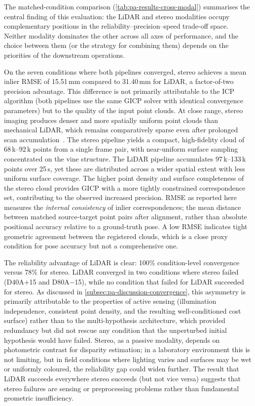 The matched-condition comparison (\cref{tab:pa-results-cross-modal}) summarises the central finding of this evaluation: the LiDAR and stereo modalities occupy complementary positions in the reliability--precision--speed trade-off space. Neither modality dominates the other across all axes of performance, and the choice between them (or the strategy for combining them) depends on the priorities of the downstream operations.

On the seven conditions where both pipelines converged, stereo achieves a mean inlier RMSE of 15.51\,mm compared to 31.40\,mm for LiDAR, a factor-of-two precision advantage. This difference is not primarily attributable to the ICP algorithm (both pipelines use the same GICP solver with identical convergence parameters) but to the quality of the input point clouds. At close range, stereo imaging produces denser and more spatially uniform point clouds than mechanical LiDAR, which remains comparatively sparse even after prolonged scan accumulation~\cite{stenEnhancingOffRoadTopography2025}. The stereo pipeline yields a compact, high-fidelity cloud of 68\,k--92\,k points from a single frame pair, with near-uniform surface sampling concentrated on the vine structure. The LiDAR pipeline accumulates 97\,k--133\,k points over 25\,s, yet these are distributed across a wider spatial extent with less uniform surface coverage. The higher point density and surface completeness of the stereo cloud provides GICP with a more tightly constrained correspondence set, contributing to the observed increased precision. RMSE as reported here measures the \emph{internal consistency} of inlier correspondences; the mean distance between matched source-target point pairs after alignment, rather than absolute positional accuracy relative to a ground-truth pose. A low RMSE indicates tight geometric agreement between the registered clouds, which is a close proxy condition for pose accuracy but not a comprehensive one.

The reliability advantage of LiDAR is clear: 100\% condition-level convergence versus 78\% for stereo. LiDAR converged in two conditions where stereo failed (D40A$+$15 and D80A$-$15), while no condition that failed for LiDAR succeeded for stereo. As discussed in \cref{subsec:pa-discussion-convergence}, this asymmetry is primarily attributable to the properties of active sensing (illumination independence, consistent point density, and the resulting well-conditioned cost surface) rather than to the multi-hypothesis architecture, which provided redundancy but did not rescue any condition that the unperturbed initial hypothesis would have failed. Stereo, as a passive modality, depends on photometric contrast for disparity estimation; in a laboratory environment this is not limiting, but in field conditions where lighting varies and surfaces may be wet or uniformly coloured, the reliability gap could widen further. The result that LiDAR succeeds everywhere stereo succeeds (but not vice versa) suggests that stereo failures are sensing or preprocessing problems rather than fundamental geometric insufficiency.

